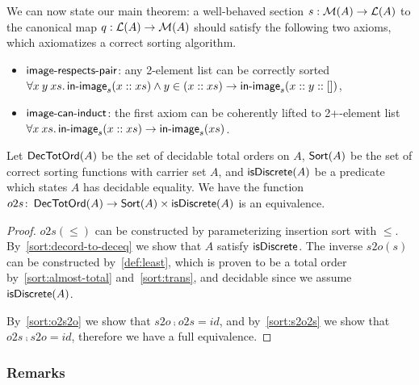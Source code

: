 We can now state our main theorem: a well-behaved section $s : \mathcal{M}(A) \to \mathcal{L}(A)$ to
the canonical map $q : \mathcal{L}(A) \to \mathcal{M}(A)$ should satisfy the following two axioms,
which axiomatizes a correct sorting algorithm.
\begin{definition}
    \leavevmode
    \begin{itemize}[leftmargin=*]
        \item $\operatorname{\mathsf{image-respects-pair}}$: any 2-element list can be correctly sorted\\
              \(
              \forall x \: y \: xs. \operatorname{\mathsf{in-image}}_s(x :: xs) \land y \in (x :: xs) \to \operatorname{\mathsf{in-image}}_s(x :: y :: [])
              \),
        \item $\operatorname{\mathsf{image-can-induct}}$: the first axiom can be coherently lifted to 2+-element list\\
              \(
              \forall x \: xs. \operatorname{\mathsf{in-image}}_s(x :: xs) \to \operatorname{\mathsf{in-image}}_s(xs)
              \).
    \end{itemize}
\end{definition}
\begin{theorem}\label{sort:main}
    Let $\operatorname{\mathsf{DecTotOrd}}(A)$ be the set of decidable total orders on $A$,
    $\operatorname{\mathsf{Sort}}(A)$ be the set of correct sorting functions with carrier set $A$,
    and $\operatorname{\mathsf{isDiscrete}}(A)$ be a predicate which states $A$ has decidable equality.
    We have the function $o2s \colon \operatorname{\mathsf{DecTotOrd}}(A) \to \operatorname{\mathsf{Sort}}(A) \times \operatorname{\mathsf{isDiscrete}}(A)$
    is an equivalence.
\end{theorem}
\begin{proof}
    $o2s(\leq)$ can be constructed by parameterizing insertion sort with $\leq$.
    By~\cref{sort:decord-to-deceq} we show that $A$ satisfy $\operatorname{\mathsf{isDiscrete}}$.
    The inverse $s2o(s)$ can be constructed by~\cref{def:least}, which is proven to be
    a total order by~\cref{sort:almost-total} and~\cref{sort:trans}, and decidable
    since we assume $\operatorname{\mathsf{isDiscrete}}(A)$.

    By~\cref{sort:o2s2o} we show that $s2o \comp o2s = id$, and by~\cref{sort:s2o2s}
    we show that $o2s \comp s2o = id$, therefore we have a full equivalence.
\end{proof}

\subsubsection*{Remarks}

